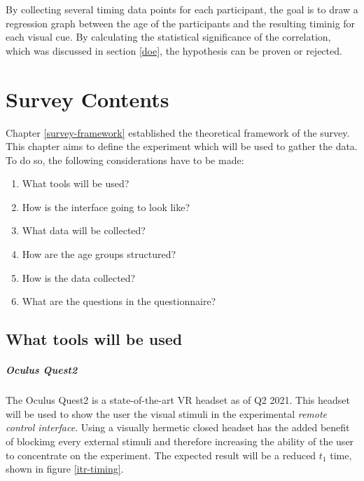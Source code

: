             By collecting several timing data points for each participant, the goal is to draw a regression graph between the age of the participants and the resulting timinig for each visual cue. By calculating the statistical significance of the correlation, which was discussed in section \ref*{doe}, the hypothesis can be proven or rejected.

    \chapter{Survey Contents}\label{survey-contents}


        Chapter \ref{survey-framework} established the theoretical framework of the survey. This chapter aims to define the experiment which will be used to gather the data. To do so, the following considerations have to be made:

        \begin{enumerate}
            \item What tools will be used?
            \item How is the interface going to look like?
            \item What data will be collected?
            \item How are the age groups structured?
            \item How is the data collected?
            \item What are the questions in the questionnaire?
        \end{enumerate}


        \section{What tools will be used}

            \paragraph{Oculus Quest2}

                The Oculus Quest2 is a state-of-the-art VR headset as of Q2 2021. This headset will be used to show the user the visual stimuli in the experimental \textit{remote control interface}. Using a visually hermetic closed headset has the added benefit of blockimg every external stimuli and therefore increasing the ability of the user to concentrate on the experiment. The expected result will be a reduced $t_{1}$ time, shown in figure \ref*{itr-timing}.

